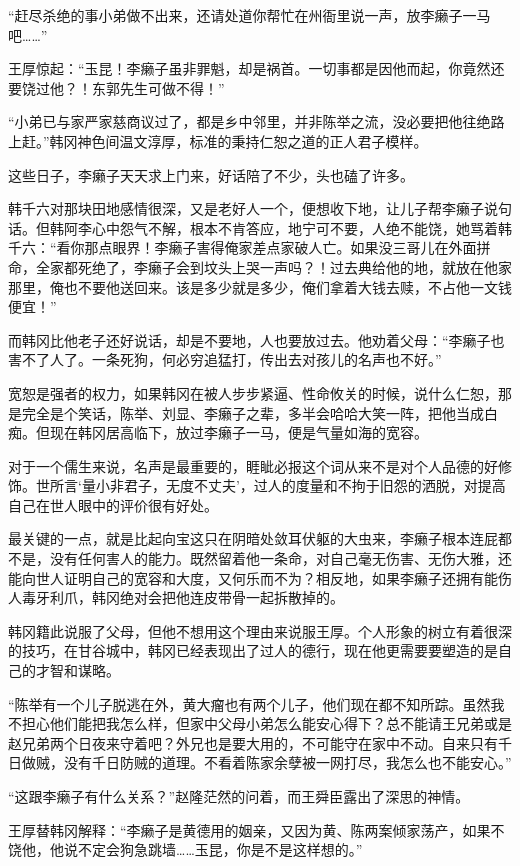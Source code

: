 “赶尽杀绝的事小弟做不出来，还请处道你帮忙在州衙里说一声，放李癞子一马吧……”

王厚惊起：“玉昆！李癞子虽非罪魁，却是祸首。一切事都是因他而起，你竟然还要饶过他？！东郭先生可做不得！”

“小弟已与家严家慈商议过了，都是乡中邻里，并非陈举之流，没必要把他往绝路上赶。”韩冈神色间温文淳厚，标准的秉持仁恕之道的正人君子模样。

这些日子，李癞子天天求上门来，好话陪了不少，头也磕了许多。

韩千六对那块田地感情很深，又是老好人一个，便想收下地，让儿子帮李癞子说句话。但韩阿李心中怨气不解，根本不肯答应，地宁可不要，人绝不能饶，她骂着韩千六：“看你那点眼界！李癞子害得俺家差点家破人亡。如果没三哥儿在外面拼命，全家都死绝了，李癞子会到坟头上哭一声吗？！过去典给他的地，就放在他家那里，俺也不要他送回来。该是多少就是多少，俺们拿着大钱去赎，不占他一文钱便宜！”

而韩冈比他老子还好说话，却是不要地，人也要放过去。他劝着父母：“李癞子也害不了人了。一条死狗，何必穷追猛打，传出去对孩儿的名声也不好。”

宽恕是强者的权力，如果韩冈在被人步步紧逼、性命攸关的时候，说什么仁恕，那是完全是个笑话，陈举、刘显、李癞子之辈，多半会哈哈大笑一阵，把他当成白痴。但现在韩冈居高临下，放过李癞子一马，便是气量如海的宽容。

对于一个儒生来说，名声是最重要的，睚眦必报这个词从来不是对个人品德的好修饰。世所言‘量小非君子，无度不丈夫’，过人的度量和不拘于旧怨的洒脱，对提高自己在世人眼中的评价很有好处。

最关键的一点，就是比起向宝这只在阴暗处敛耳伏躯的大虫来，李癞子根本连屁都不是，没有任何害人的能力。既然留着他一条命，对自己毫无伤害、无伤大雅，还能向世人证明自己的宽容和大度，又何乐而不为？相反地，如果李癞子还拥有能伤人毒牙利爪，韩冈绝对会把他连皮带骨一起拆散掉的。

韩冈籍此说服了父母，但他不想用这个理由来说服王厚。个人形象的树立有着很深的技巧，在甘谷城中，韩冈已经表现出了过人的德行，现在他更需要要塑造的是自己的才智和谋略。

“陈举有一个儿子脱逃在外，黄大瘤也有两个儿子，他们现在都不知所踪。虽然我不担心他们能把我怎么样，但家中父母小弟怎么能安心得下？总不能请王兄弟或是赵兄弟两个日夜来守着吧？外兄也是要大用的，不可能守在家中不动。自来只有千日做贼，没有千日防贼的道理。不看着陈家余孽被一网打尽，我怎么也不能安心。”

“这跟李癞子有什么关系？”赵隆茫然的问着，而王舜臣露出了深思的神情。

王厚替韩冈解释：“李癞子是黄德用的姻亲，又因为黄、陈两案倾家荡产，如果不饶他，他说不定会狗急跳墙……玉昆，你是不是这样想的。”

